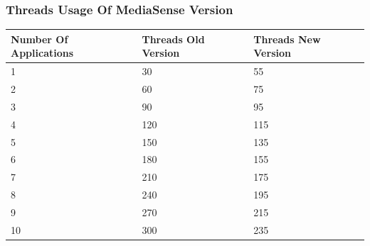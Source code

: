 \subsubsection{Threads Usage Of MediaSense Version}
\begin{center}
    \begin{tabular}[t!]{ | l | l | l |}
    \hline
    Number Of Applications								& Threads Old Version			& Threads New Version\\ \hline
    1 													& 30							& 55\\ \hline
    2 													& 60							& 75\\ \hline
    3 													& 90							& 95\\ \hline
    4 													& 120							& 115\\ \hline
    5 													& 150							& 135\\ \hline
    6 													& 180							& 155\\ \hline
    7 													& 210							& 175\\ \hline
    8 													& 240							& 195\\ \hline
    9 													& 270							& 215\\ \hline
    10 													& 300							& 235\\ \hline
    \end{tabular}
\end{center}
\clearpage

